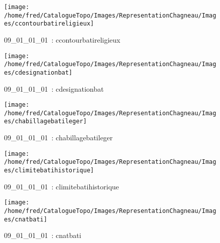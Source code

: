 \documentclass[12pt,titlepage]{book}
\begin{document}
\begin{figure}[h!]
\begin{minipage}[t]{3cm}
\begin{center}
    \end{center}
  \end{minipage}
  \begin{minipage}[t]{3cm}
    \begin{center}
      \texttt{[image: /home/fred/CatalogueTopo/Images/RepresentationChagneau/Images/ccontourbatireligieux]}
      \caption[~09\_01\_01\_01]{\small{09\_01\_01\_01~:} \tiny{ccontourbatireligieux}}\label{ccontourbatireligieux}
    \end{center}
  \end{minipage}
  \begin{minipage}[t]{3cm}
    \begin{center}
      \texttt{[image: /home/fred/CatalogueTopo/Images/RepresentationChagneau/Images/cdesignationbat]}
      \caption[~09\_01\_01\_01]{\small{09\_01\_01\_01~:} \tiny{cdesignationbat}}\label{cdesignationbat}
    \end{center}
  \end{minipage}
  \begin{minipage}[t]{3cm}
    \begin{center}
      \texttt{[image: /home/fred/CatalogueTopo/Images/RepresentationChagneau/Images/chabillagebatileger]}
      \caption[~09\_01\_01\_01]{\small{09\_01\_01\_01~:} \tiny{chabillagebatileger}}\label{chabillagebatileger}
    \end{center}
  \end{minipage}
  \begin{minipage}[t]{3cm}
    \begin{center}
      \texttt{[image: /home/fred/CatalogueTopo/Images/RepresentationChagneau/Images/climitebatihistorique]}
      \caption[~09\_01\_01\_01]{\small{09\_01\_01\_01~:} \tiny{climitebatihistorique}}\label{climitebatihistorique}
    \end{center}
  \end{minipage}
  \begin{minipage}[t]{3cm}
    \begin{center}
      \texttt{[image: /home/fred/CatalogueTopo/Images/RepresentationChagneau/Images/cnatbati]}
      \caption[~09\_01\_01\_01]{\small{09\_01\_01\_01~:} \tiny{cnatbati}}\label{cnatbati}
    \end{center}
  \end{minipage}

\end{figure}
\end{document}
